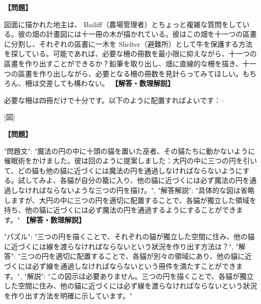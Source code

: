\documentclass[10pt,a4paper,oneside,openany]{ltjsbook}
\begin{document}
\begin{tcolorbox}[colback=softblue,colframe=primaryblue,title=\textbf{第 166 問：地主の柵 （原題: THE LANDOWNER'S FENCES.）},arc=2mm,boxrule=1pt,breakable]
\textbf{【問題】}\par\vspace{0.3em}
図面に描かれた地主は、 Bailiff（農場管理者）とちょっと複雑な質問をしている。彼の畑の計畫図には十一冊の木が描かれている。彼はこの畑を十一つの區畫に分割し、それぞれの區畫に一木を Shelter（避難所）として牛を保護する方法を探している。可能であれば、必要な柵の冊数を最小限に抑えながら、十一つの區畫を作り出すことができるか？鉛筆を取り出し、畑に直線的な柵を描き、十一つの區畫を作り出しながら、必要となる柵の冊数を見計らってみてほしい。もちろん、柵は交差しても構わない。
\tcblower
\textbf{【解答・数理解説】}\par\vspace{0.3em}
必要な柵は四冊だけで十分です。以下のように配置すればよいです：--

[図]
\end{tcolorbox}

\begin{tcolorbox}[colback=softblue,colframe=primaryblue,title=\textbf{第 167 問：THE WIZARD'S CATS.},arc=2mm,boxrule=1pt,breakable]
\textbf{【問題】}\par\vspace{0.3em}
{
"問題文": "魔法の円の中に十頭の貓を置いた巫者、その貓たちに動かないように催眠術をかけました。彼は回のように提案しました：大円の中に三つの円を引いて、どの貓も他の貓に近づくには魔法の円を通過しなければならないようにする。試してみよ、各貓が自分の籠に入り、他の貓に近づくには必ず魔法の円を通過しなければならないような三つの円を描け。",
"解答解説": "具体的な図は省略しますが、大円の中に三つの円を適切に配置することで、各貓が獨立した領域を持ち、他の貓に近づくには必ず魔法の円を通過するようにすることができます。"
}
\tcblower
\textbf{【解答・数理解説】}\par\vspace{0.3em}
{
"パズル": "三つの円を描くことで、それぞれの貓が獨立した空間に住み、他の貓に近づくには線を渡らなければならないという狀況を作り出す方法は？",
"解答": "三つの円を適切に配置することで、各貓が別々の領域にあり、他の貓に近づくには必ず線を通過しなければならないという冊件を満たすことができます。",
"解説": "この図示は必要ありません。三つの円を描くことで、各貓が獨立した空間に住み、他の貓に近づくには必ず線を渡らなければならないという狀況を作り出す方法を明確に示しています。"
}
\end{tcolorbox}
\end{document}
